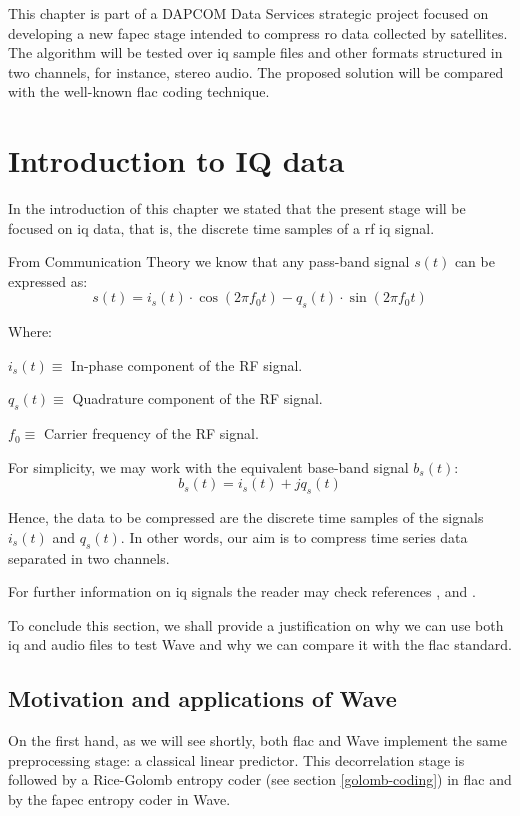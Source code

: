 This chapter is part of a DAPCOM Data Services strategic project focused on developing a new \acrshort{fapec} stage intended to compress \acrshort{ro} data collected by satellites. The algorithm will be tested over \acrshort{iq} sample files and other formats structured in two channels, for instance, stereo audio. The proposed solution will be compared with the well-known \acrshort{flac} coding technique.

\section{Introduction to IQ data}

In the introduction of this chapter we stated that the present stage will be focused on \acrshort{iq} data, that is, the discrete time samples of a \acrshort{rf} \acrshort{iq} signal.

From Communication Theory we know that any pass-band signal $s(t)$ can be expressed as:
\begin{equation}
s(t) = i_s(t) \cdot \cos(2\pi f_0 t) - q_s(t) \cdot \sin(2\pi f_0 t)
\end{equation}

Where:
\begin{description}
	\item $i_s(t) \equiv$ In-phase component of the RF signal.
	\item $q_s(t) \equiv$ Quadrature component of the RF signal.
	\item $f_0 \equiv$ Carrier frequency of the RF signal.
\end{description}

For simplicity, we may work with the equivalent base-band signal $b_s(t)$:
\begin{equation}
	b_s(t) = i_s(t) + j q_s(t)
\end{equation}

Hence, the data to be compressed are the discrete time samples of the signals $i_s(t)$ and $q_s(t)$. In other words, our aim is to compress time series data separated in two channels.

For further information on \acrshort{iq} signals the reader may check references \parencite{IQintro}, \parencite{carlson2010communication} and \parencite{ICOM}.

To conclude this section, we shall provide a justification on why we can use both \acrshort{iq} and audio files to test Wave and why we can compare it with the \acrshort{flac} standard.

\subsection{Motivation and applications of Wave}
On the first hand, as we will see shortly, both \acrshort{flac} and Wave implement the same preprocessing stage: a classical linear predictor. This decorrelation stage is followed by a Rice-Golomb entropy coder (see section \ref{golomb-coding}) in \acrshort{flac} and by the \acrshort{fapec} entropy coder in Wave.

